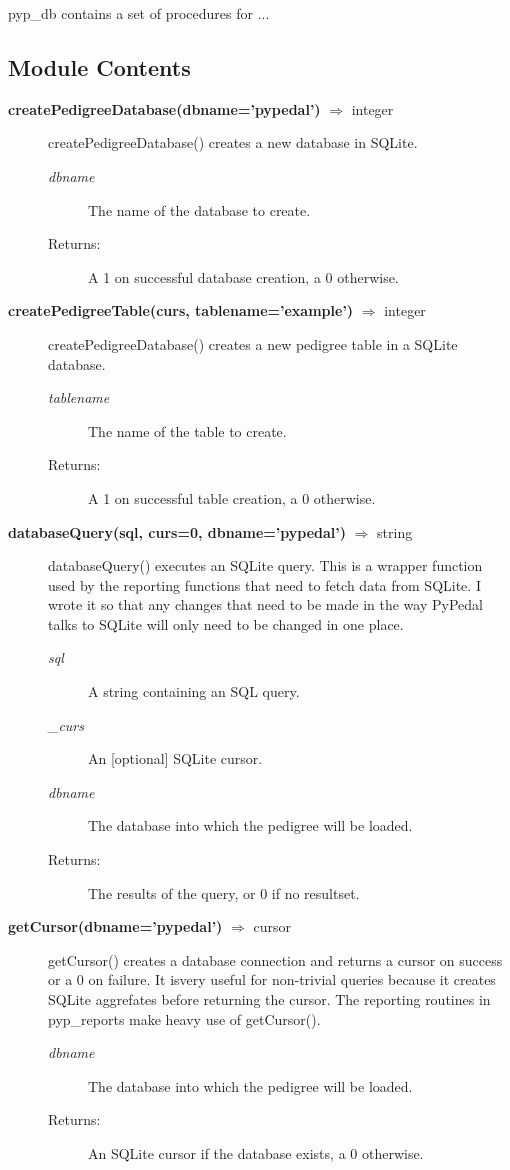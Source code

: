 pyp\_db contains a set of procedures for ...

\subsection*{Module Contents}

\begin{description}
\item[\textbf{createPedigreeDatabase(dbname='pypedal')} $\Rightarrow$ integer]
createPedigreeDatabase() creates a new database in SQLite.
\begin{description}
\item[\emph{dbname}] The name of the database to create.
\item[Returns:] A 1 on successful database creation, a 0 otherwise.
\end{description}

\item[\textbf{createPedigreeTable(curs, tablename='example')} $\Rightarrow$ integer]
createPedigreeDatabase() creates a new pedigree table in a SQLite database.
\begin{description}
\item[\emph{tablename}] The name of the table to create.
\item[Returns:] A 1 on successful table creation, a 0 otherwise.
\end{description}

\item[\textbf{databaseQuery(sql, curs=0, dbname='pypedal')} $\Rightarrow$ string]
databaseQuery() executes an SQLite query. This is a wrapper function used by the reporting functions that need to fetch data from SQLite. I wrote it so that any changes that need to be made in the way PyPedal talks to SQLite will only need to be changed in one place.
\begin{description}
\item[\emph{sql}] A string containing an SQL query.
\item[\emph{\_curs}] An [optional] SQLite cursor.
\item[\emph{dbname}] The database into which the pedigree will be loaded.
\item[Returns:] The results of the query, or 0 if no resultset.
\end{description}

\item[\textbf{getCursor(dbname='pypedal')} $\Rightarrow$ cursor]
getCursor() creates a database connection and returns a cursor on success or a 0 on failure. It isvery useful for non-trivial queries because it creates SQLite aggrefates before returning the cursor. The reporting routines in pyp\_reports make heavy use of getCursor().
\begin{description}
\item[\emph{dbname}] The database into which the pedigree will be loaded.
\item[Returns:] An SQLite cursor if the database exists, a 0 otherwise.
\end{description}


\end{description}
